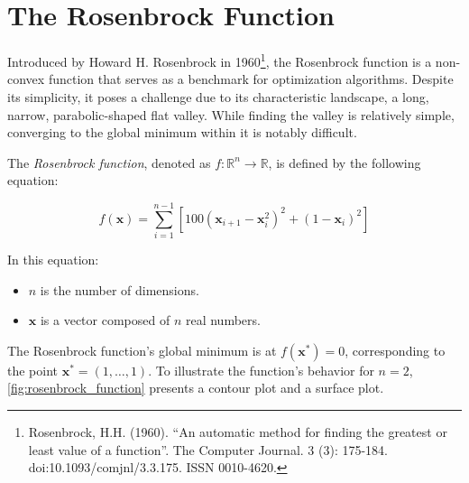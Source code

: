 \section{The Rosenbrock Function}
\label{sec:rosenbrock_function}

  Introduced by Howard H. Rosenbrock in 1960\footnote{
    Rosenbrock, H.H. (1960). \enquote{An automatic method for finding the
    greatest or least value of a function}. The Computer Journal. 3 (3): 
    175-184. doi:10.1093/comjnl/3.3.175. ISSN 0010-4620.
  }, the Rosenbrock function is a non-convex function that serves as a benchmark
  for optimization algorithms.
  Despite its simplicity, it poses a challenge due to its characteristic
  landscape, a long, narrow, parabolic-shaped flat valley.
  While finding the valley is relatively simple, converging to the global
  minimum within it is notably difficult.

  \begin{definition}
    \label{def:rosenbrock_function}
    The \emph{Rosenbrock function}, denoted as \(f: \mathbb{R}^n \rightarrow 
    \mathbb{R}\), is defined by the following equation:

    \begin{equation}
    \label{eq:rosenbrock_function}
      f(\mathbf{x}) 
        = \sum_{i=1}^{n-1} \left[ 
          100 (\mathbf{x}_{i+1} - \mathbf{x}_i^2)^2 + (1 - \mathbf{x}_i)^2 
        \right]
    \end{equation}

    In this equation:

    \begin{itemize}
      \item \(n\) is the number of dimensions.
      \item \(\mathbf{x}\) is a vector composed of \(n\) real numbers.
    \end{itemize}
  \end{definition}

  The Rosenbrock function's global minimum is at \(f(\mathbf{x}^*) = 0\), 
  corresponding to the point \(\mathbf{x}^* = (1, \ldots, 1)\).
  To illustrate the function's behavior for \(n = 2\), 
  \vref{fig:rosenbrock_function} presents a contour plot and a surface plot.

